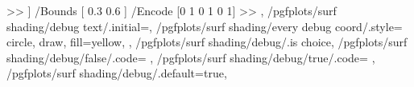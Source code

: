 {{{					>>
				]
				/Bounds [ 0.3 0.6 ] 
				/Encode [0 1  0 1 0 1] 
			>> 
		}%
	},%
	/pgfplots/surf shading/debug text/.initial=\the\c@pgfplotslibrarysurf@no,
	/pgfplots/surf shading/every debug coord/.style={
		circle,
		draw,
		fill=yellow,
	},
	/pgfplots/surf shading/debug/.is choice,
	/pgfplots/surf shading/debug/false/.code={%
		\let\pgfplotslibrarysurfprocesscoordinate=\pgfplotslibrarysurfprocesscoordinate@orig
		\let\pgfplotslibrarysurfusepath=\pgfplotslibrarysurfusepath@orig
	},
	/pgfplots/surf shading/debug/true/.code={%
		\let\pgfplotslibrarysurfprocesscoordinate=\pgfplotslibrarysurfprocesscoordinate@debug
		\def\pgfplotslibrarysurfusepath{\pgfusepath{stroke,fill}}
	},
	/pgfplots/surf shading/debug/.default=true,
}%

\def\pgfplotslibrarysurf@corner@sw{\pgfplots@error{This is unavailable until \string\pgfplotslibrarysurfstreamend}}
\let\pgfplotslibrarysurf@corner@ne\pgfplotslibrarysurf@corner@sw

\def\pgfplotslibrarysurf@bytespercomponent{2}%
\def\pgfplotslibrarysurf@bitspercomponent{16}%

\def\pgfplotslibrarysurf@decode{%
	-16383.999992 16384 %
	-16383.999992 16384 %
	\pgfplotslibrarysurf@decode@colors
}%
\def\pgfplotslibrarysurf@decode@colors@colormap{%
	0 \pgfplotscolormappdfmax %
}%
\def\pgfplotslibrarysurf@decode@colors@explicit@one@component{%
	0 1 %
}%

\def\pgfplotslibrarysurf@count{0}%
\newcount\c@pgfplotslibrarysurf@no

\def\pgfplotslibrarysurf@initstream{%
	\edef\pgfplots@loc@TMPa{\pgfkeysvalueof{/pgfplots/surf shading/pdf stream filter}}%
	\ifx\pgfplots@loc@TMPa\pgfutil@empty
	\else
		\let\pgfplotslibrarysurf@filter@encode=\pgfplots@loc@TMPa
		\let\pgfplotslibrarysurf@filter@decode=\pgfplotslibrarysurf@filter@encode
	\fi
}

\def\pgfplotslibrarysurf@advancestreamlen#1{}%


